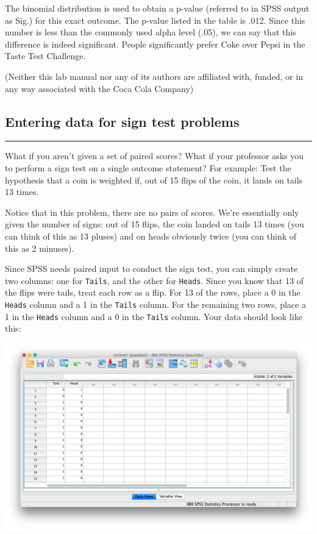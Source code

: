 \documentclass[
]{book}
\begin{document}
The binomial distribution is used to obtain a p-value (referred to in SPSS output as Sig.) for this exact outcome. The p-value listed in the table is .012. Since this number is less than the commonly used alpha level (.05), we can say that this difference is indeed significant. People significantly prefer Coke over Pepsi in the Taste Test Challenge.

(Neither this lab manual nor any of its authors are affiliated with, funded, or in any way associated with the Coca Cola Company)

\hypertarget{entering-data-for-sign-test-problems}{%
\subsection{Entering data for sign test problems}\label{entering-data-for-sign-test-problems}}

\begin{center}\rule{0.5\linewidth}{0.5pt}\end{center}

What if you aren't given a set of paired scores? What if your professor asks you to perform a sign test on a single outcome statement? For example: Test the hypothesis that a coin is weighted if, out of 15 flips of the coin, it lands on tails 13 times.

Notice that in this problem, there are no pairs of scores. We're essentially only given the number of signs: out of 15 flips, the coin landed on tails 13 times (you can think of this as 13 pluses) and on heads obviously twice (you can think of this as 2 minuses).

Since SPSS needs paired input to conduct the sign test, you can simply create two columns: one for \texttt{Tails}, and the other for \texttt{Heads}. Since you know that 13 of the flips were tails, treat each row as a flip. For 13 of the rows, place a 0 in the \texttt{Heads} column and a 1 in the \texttt{Tails} column. For the remaining two rows, place a 1 in the \texttt{Heads} column and a 0 in the \texttt{Tails} column. Your data should look like this:

\includegraphics{img/5.4.18.png}
\end{document}
